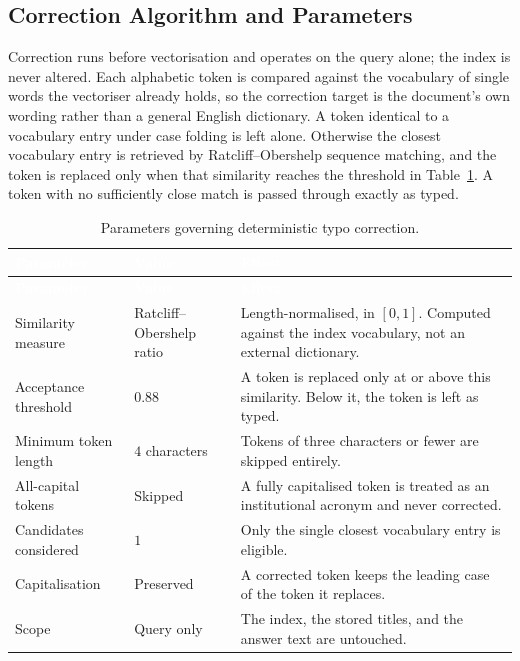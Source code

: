 \subsection{Correction Algorithm and Parameters}
\label{sec:typoparams}

Correction runs before vectorisation and operates on the query alone; the index is never
altered. Each alphabetic token is compared against the vocabulary of single words the
vectoriser already holds, so the correction target is the document's own wording rather than
a general English dictionary. A token identical to a vocabulary entry under case folding is
left alone. Otherwise the closest vocabulary entry is retrieved by Ratcliff--Obershelp
sequence matching, and the token is replaced only when that similarity reaches the threshold
in Table~\ref{tab:typoparams}. A token with no sufficiently close match is passed through
exactly as typed.

\begin{longtable}{|p{}|p{}|p{}|}
\caption{Parameters governing deterministic typo correction.}\label{tab:typoparams}\\
\hline
\rowcolor{myblue}\textcolor{white}{\textbf{Parameter}} & \textcolor{white}{\textbf{Value}} & \textcolor{white}{\textbf{Effect}} \\
\hline
\endfirsthead
\hline
\rowcolor{myblue}\textcolor{white}{\textbf{Parameter}} & \textcolor{white}{\textbf{Value}} & \textcolor{white}{\textbf{Effect}} \\
\hline
\endhead
Similarity measure & Ratcliff--Obershelp ratio & Length-normalised, in $[0,1]$. Computed against the index vocabulary, not an external dictionary. \\ \hline
Acceptance threshold & $0.88$ & A token is replaced only at or above this similarity. Below it, the token is left as typed. \\ \hline
Minimum token length & $4$ characters & Tokens of three characters or fewer are skipped entirely. \\ \hline
All-capital tokens & Skipped & A fully capitalised token is treated as an institutional acronym and never corrected. \\ \hline
Candidates considered & $1$ & Only the single closest vocabulary entry is eligible. \\ \hline
Capitalisation & Preserved & A corrected token keeps the leading case of the token it replaces. \\ \hline
Scope & Query only & The index, the stored titles, and the answer text are untouched. \\ \hline
\end{longtable}

